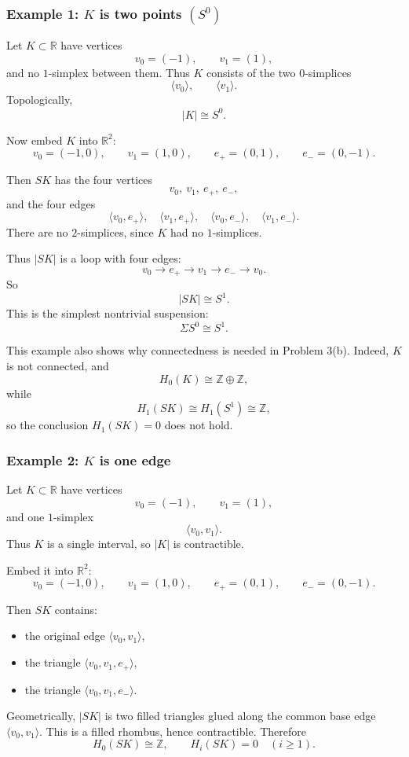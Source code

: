\documentclass[12pt,a4paper]{article}
\theoremstyle{notespace}
\begin{document}
\subsubsection*{Example 1: \(K\) is two points \((S^0)\)}

Let \(K\subset \mathbb R\) have vertices
\[
v_0=(-1),
\qquad
v_1=(1),
\]
and no \(1\)-simplex between them. Thus \(K\) consists of the two \(0\)-simplices
\[
\langle v_0\rangle,
\qquad
\langle v_1\rangle.
\]
Topologically,
\[
|K|\cong S^0.
\]

Now embed \(K\) into \(\mathbb R^2\):
\[
v_0=(-1,0),
\qquad
v_1=(1,0),
\qquad
e_+=(0,1),
\qquad
e_-=(0,-1).
\]

Then \(SK\) has the four vertices
\[
v_0,\ v_1,\ e_+,\ e_-,
\]
and the four edges
\[
\langle v_0,e_+\rangle,\quad
\langle v_1,e_+\rangle,\quad
\langle v_0,e_-\rangle,\quad
\langle v_1,e_-\rangle.
\]
There are no \(2\)-simplices, since \(K\) had no \(1\)-simplices.

Thus \(|SK|\) is a loop with four edges:
\[
v_0\to e_+\to v_1\to e_-\to v_0.
\]
So
\[
|SK|\cong S^1.
\]
This is the simplest nontrivial suspension:
\[
\Sigma S^0\cong S^1.
\]

This example also shows why connectedness is needed in Problem \(3\)(b). Indeed, \(K\) is not connected, and
\[
H_0(K)\cong \mathbb Z\oplus \mathbb Z,
\]
while
\[
H_1(SK)\cong H_1(S^1)\cong \mathbb Z,
\]
so the conclusion \(H_1(SK)=0\) does not hold.

\subsubsection*{Example 2: \(K\) is one edge}

Let \(K\subset \mathbb R\) have vertices
\[
v_0=(-1),
\qquad
v_1=(1),
\]
and one \(1\)-simplex
\[
\langle v_0,v_1\rangle.
\]
Thus \(K\) is a single interval, so \(|K|\) is contractible.

Embed it into \(\mathbb R^2\):
\[
v_0=(-1,0),
\qquad
v_1=(1,0),
\qquad
e_+=(0,1),
\qquad
e_-=(0,-1).
\]

Then \(SK\) contains:
\begin{itemize}
	\item the original edge \(\langle v_0,v_1\rangle\),
	\item the triangle \(\langle v_0,v_1,e_+\rangle\),
	\item the triangle \(\langle v_0,v_1,e_-\rangle\).
\end{itemize}

Geometrically, \(|SK|\) is two filled triangles glued along the common base edge \(\langle v_0,v_1\rangle\). This is a filled rhombus, hence contractible. Therefore
\[
H_0(SK)\cong \mathbb Z,
\qquad
H_i(SK)=0\quad (i\ge 1).
\]
\end{document}
